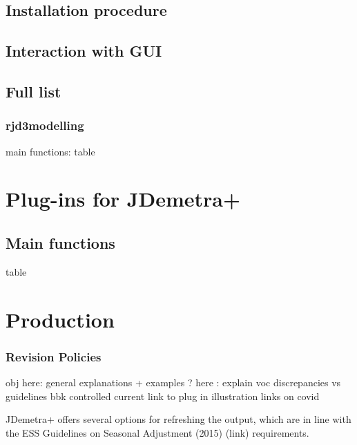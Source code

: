 \documentclass[
  letterpaper,
  DIV=11,
  numbers=noendperiod]{scrreprt}
\begin{document}
\hypertarget{installation-procedure}{%
\section{Installation procedure}\label{installation-procedure}}

\hypertarget{interaction-with-gui}{%
\section{Interaction with GUI}\label{interaction-with-gui}}

\hypertarget{full-list}{%
\section{Full list}\label{full-list}}

\hypertarget{rjd3modelling}{%
\subsection{rjd3modelling}\label{rjd3modelling}}

main functions: table

\hypertarget{plug-ins-for-jdemetra}{%
\chapter{Plug-ins for JDemetra+}\label{plug-ins-for-jdemetra}}

\hypertarget{main-functions}{%
\section{Main functions}\label{main-functions}}

table

\hypertarget{production}{%
\chapter{Production}\label{production}}

\hypertarget{revision-policies}{%
\subsection{Revision Policies}\label{revision-policies}}

obj here: general explanations + examples ? here : explain voc
discrepancies vs guidelines bbk controlled current link to plug in
illustration links on covid

JDemetra+ offers several options for refreshing the output, which are in
line with the ESS Guidelines on Seasonal Adjustment (2015) (link)
requirements.
\end{document}
